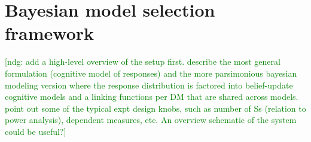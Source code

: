 \documentclass{article}
\newcommand{\ndg}[1]{\textcolor{Green}{[ndg: #1]}}
\begin{document}


\section{Bayesian model selection framework}
\label{s:bayes}

\ndg{add a high-level overview of the setup first. describe the most general formulation (cognitive model of responses) and the more parsimonious bayesian modeling version where the response distribution is factored into belief-update cognitive models and a linking functions per DM that are shared across models.  point out some of the typical expt design knobs, such as number of Ss (relation to power analysis), dependent measures, etc. An overview schematic of the system could be useful?}
\end{document}
